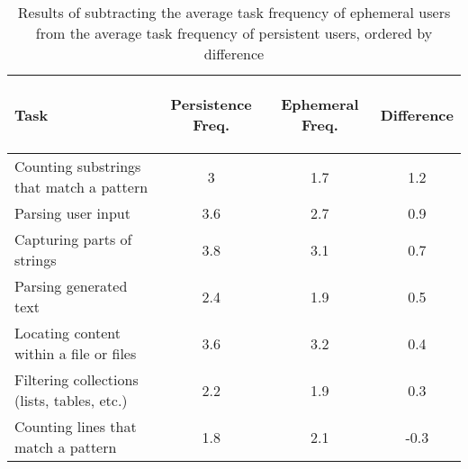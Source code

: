 \begin{table}
\caption{Results of subtracting the average task frequency of ephemeral users from the average task frequency of persistent users, ordered by difference \label{table:regexPersistingTasks}}
\begin{center}
\begin{small}
\begin{tabular}{lccc}
\toprule
\textbf{Task} & \begin{footnotesize}\textbf{Persistence Freq.}\end{footnotesize} & \begin{footnotesize}\textbf{Ephemeral Freq.}\end{footnotesize} & \textbf{Difference} \\  \midrule \bigstrut
Counting  substrings that match a pattern & 3 & 1.7 & 1.2\\  \midrule \bigstrut
Parsing user input & 3.6 & 2.7 & 0.9\\ \midrule \bigstrut
Capturing parts of strings & 3.8 & 3.1 & 0.7\\ \midrule \bigstrut
Parsing generated text & 2.4 & 1.9 & 0.5\\  \midrule \bigstrut
Locating content within a file or files & 3.6 & 3.2 & 0.4\\ \midrule \bigstrut
Filtering collections (lists, tables, etc.) & 2.2 & 1.9 & 0.3\\ \midrule \bigstrut
Counting lines that match a pattern & 1.8 & 2.1 & -0.3\\
\bottomrule
\end{tabular}
\end{small}
\end{center}
\vspace{-12pt}
\end{table}

